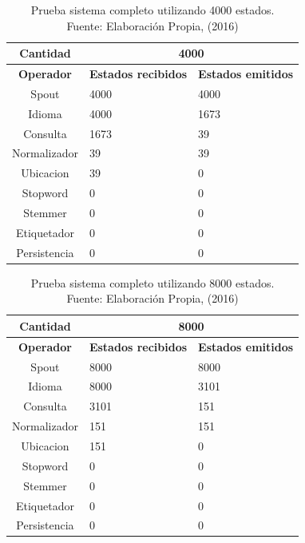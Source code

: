 \begin{table}[H]
\centering
\caption[Prueba sistema completo utilizando 4000 estados.]{Prueba sistema completo utilizando 4000 estados.\\Fuente: Elaboración Propia, (2016)}
\label{PruebaSistFull4000}
\begin{tabular}{|c|l|l|}
\hline
\textbf{Cantidad} & \multicolumn{2}{c|}{\textbf{4000}} \\ \hline
\textbf{Operador} & \multicolumn{1}{c|}{\textbf{Estados recibidos}} & \multicolumn{1}{c|}{\textbf{Estados emitidos}} \\ \hline
Spout & 4000 & 4000 \\ \hline
Idioma & 4000 & 1673 \\ \hline
Consulta & 1673 & 39 \\ \hline
Normalizador & 39 & 39 \\ \hline
Ubicacion & 39 & 0 \\ \hline
Stopword & 0 & 0 \\ \hline
Stemmer & 0 & 0 \\ \hline
Etiquetador & 0 & 0 \\ \hline
Persistencia & 0 & 0 \\ \hline
\end{tabular}
\end{table}

\begin{table}[H]
\centering
\caption[Prueba sistema completo utilizando 8000 estados.]{Prueba sistema completo utilizando 8000 estados.\\Fuente: Elaboración Propia, (2016)}
\label{PruebaSistFull8000}
\begin{tabular}{|c|l|l|}
\hline
\textbf{Cantidad} & \multicolumn{2}{c|}{\textbf{8000}} \\ \hline
\textbf{Operador} & \multicolumn{1}{c|}{\textbf{Estados recibidos}} & \multicolumn{1}{c|}{\textbf{Estados emitidos}} \\ \hline
Spout & 8000 & 8000 \\ \hline
Idioma & 8000 & 3101 \\ \hline
Consulta & 3101 & 151 \\ \hline
Normalizador & 151 & 151 \\ \hline
Ubicacion & 151 & 0 \\ \hline
Stopword & 0 & 0 \\ \hline
Stemmer & 0 & 0 \\ \hline
Etiquetador & 0 & 0 \\ \hline
Persistencia & 0 & 0 \\ \hline
\end{tabular}
\end{table}

